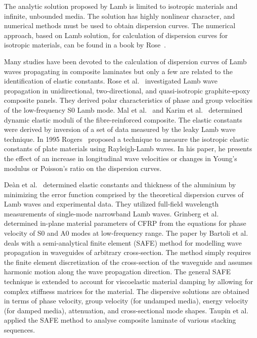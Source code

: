\documentclass[preprint,12pt]{elsarticle}
\begin{document}
	The analytic solution proposed by Lamb is limited to isotropic materials and infinite, unbounded media. The solution has highly nonlinear character, and numerical methods must be used to obtain dispersion curves. The numerical approach, based on Lamb solution, for calculation of dispersion curves for isotropic materials, can be found in a book by Rose~\cite{Rose1999}.
	
	Many studies have been devoted to the calculation of dispersion curves of Lamb waves propagating in composite laminates but only a few are related to the identification of elastic constants. Rose et al.~\cite{Rose1987} investigated Lamb wave propagation in unidirectional, two-directional, and quasi-isotropic graphite-epoxy composite panels. They derived polar characteristics of phase and group velocities of the low-frequency S0 Lamb mode. Mal et al.~\cite{Mal1993} and Karim et al.~\cite{Karim1990} determined dynamic elastic moduli of the fibre-reinforced composite. The elastic constants were derived by inversion of a set of data measured by the leaky Lamb wave technique. In 1995 Rogers~\cite{Rogers1995} proposed a technique to measure the isotropic elastic constants of plate materials using Rayleigh-Lamb waves. In his paper, he presents the effect of an increase in longitudinal wave velocities or changes in Young’s modulus or Poisson’s ratio on the dispersion curves.
	
	De\`an et al.~\cite{Dean2008} determined elastic constants and thickness of the aluminium by minimizing the error function comprised by the theoretical dispersion curves of Lamb waves and experimental data. They utilized full-field wavelength measurements of single-mode narrowband Lamb waves. Grinberg et al.~\cite{Grimberg2010} determined in-plane material parameters of CFRP from the equations for phase velocity of S0 and A0 modes at low-frequency range. 
	The paper by Bartoli et al.~\cite{Bartoli2006} deals with a semi-analytical finite element (SAFE) method for modelling wave propagation in waveguides of arbitrary cross-section. The method simply requires the finite element discretization of the cross-section of the waveguide and assumes harmonic motion along the wave propagation direction. The general SAFE technique is extended to account for viscoelastic material damping by allowing for complex stiffness matrices for the material. The dispersive solutions are obtained in terms of phase velocity, group velocity (for undamped media), energy velocity (for damped media), attenuation, and cross-sectional mode shapes. Taupin et al.~\cite{Taupin2011} applied the SAFE method to analyse composite laminate of various stacking sequences.
	
\end{document}
